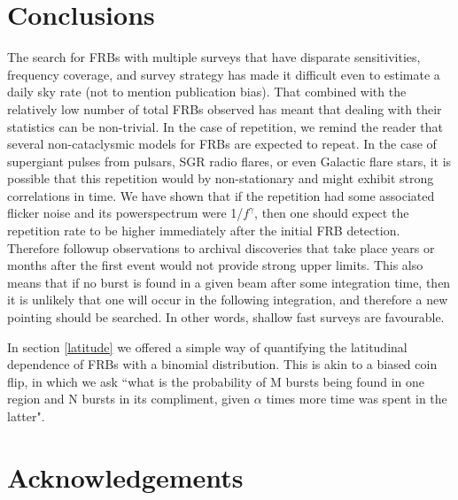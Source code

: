 \documentclass[useAMS,usenatbib]{mn2e}
\begin{document}
\section{Conclusions}

The search for FRBs with multiple surveys that have disparate sensitivities, 
frequency coverage, and survey strategy has made it difficult even to 
estimate a daily sky rate (not to mention publication bias). 
That combined with the relatively low number of total FRBs observed 
has meant that dealing with their statistics can be non-trivial. In 
the case of repetition, we remind the reader that several non-cataclysmic 
models for FRBs are expected to repeat. In the case of supergiant 
pulses from pulsars, SGR radio flares, or even Galactic flare stars, it is possible 
that this repetition would by non-stationary and might exhibit strong correlations 
in time. We have shown that if the repetition had some associated flicker noise 
and its powerspectrum were 1/$f^\gamma$, then one should expect the repetition 
rate to be higher immediately after the initial FRB detection. Therefore followup 
observations to archival discoveries that take place years or 
months after the first event would not provide strong upper limits. 
This also means that if no burst is found in a given beam after some 
integration time, then it is unlikely that one will occur in the following integration, and therefore 
a new pointing should be searched. In other words, shallow fast surveys are favourable. 

In section \ref{latitude} we offered a simple way of quantifying the 
latitudinal dependence of FRBs with a binomial distribution. This 
is akin to a biased coin flip, in which we ask ``what is the probability of 
M bursts being found in one region and N bursts in its compliment, given 
$\alpha$ times more time was spent in the latter". 



\section{Acknowledgements}
\end{document}

